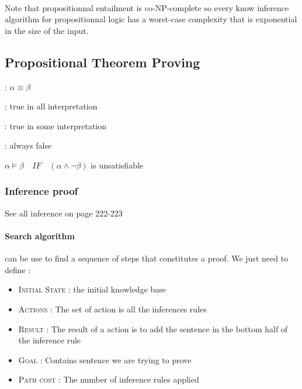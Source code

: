 \paragraph{} Note that propositionnal entailment is co-NP-complete so every know inference
algorithm for propositionnal logic has a worst-case complexity that is exponential in
the size of the input.

\subsection{Propositional Theorem Proving}

\begin{description}
    \item[Logical equivalence] : $\alpha \equiv \beta$
    \item[Valid] : true in all interpretation
    \item[Satisfiable] : true in some interpretation
    \item[Unsatisfiable/Inconsistency] : always false
    \item
    \item $\alpha \models \beta \quad IF \quad (\alpha \wedge \neg \beta)$ is unsatisfiable
\end{description}

\subsubsection{Inference proof}
See all inference on page 222-223

\paragraph{Search algorithm} can be use to find a sequence of steps that constitutes a proof.
We just need to define : 
\begin{itemize}
    \item \textsc{Initial State} : the initial knowledge base
    \item \textsc{Actions} : The set of action is all the inferences rules
    \item \textsc{Result} : The result of a action is to add the sentence in the bottom half of the inference 
    rule
    \item \textsc{Goal} : Contains sentence we are trying to prove
    \item \textsc{Path cost} : The number of inference rules applied
\end{itemize}

